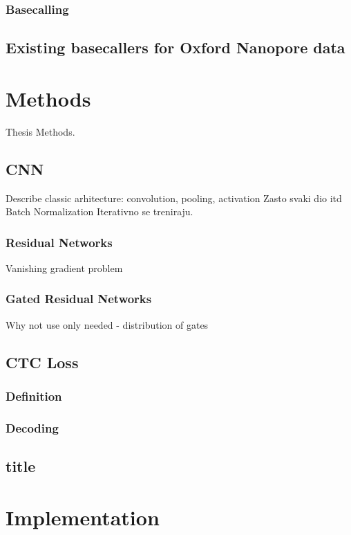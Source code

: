 \documentclass[times, utf8, diplomski, english]{fer}
\begin{document}
\subsection{Basecalling}

\section{Existing basecallers for Oxford Nanopore data}



\chapter{Methods}
Thesis Methods.
\section{CNN}
Describe classic arhitecture: convolution, pooling, activation
Zasto svaki dio itd
Batch Normalization 
Iterativno se treniraju.

\subsection{Residual Networks}
Vanishing gradient problem
\subsection{Gated Residual Networks}
Why not use only needed - distribution of gates

\section{CTC Loss}
\subsection{Definition}
\subsection{Decoding}


\section{title}
\chapter{Implementation}
\end{document}

